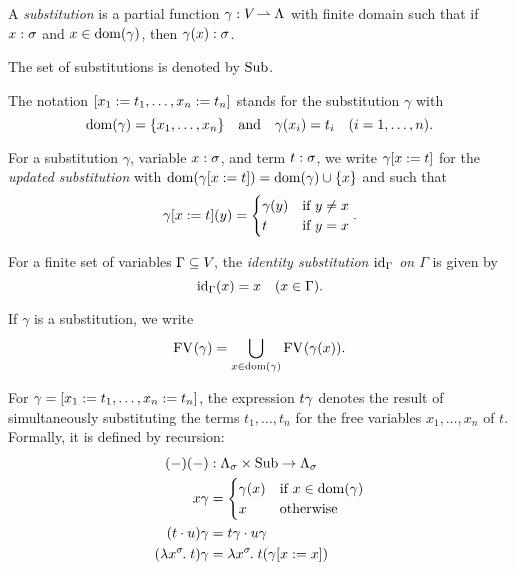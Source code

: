 \begin{defn}[Substitution] \label{def:substitution}
A \emph{substitution} is a partial function $\gamma : \Var \pto \Tm$ with finite domain such that if $\typedvar{x}{\sigma}$ and $x \in \dom{\gamma}$, then $\typedtm{\gamma(x)}{\sigma}$.
\end{defn}

The set of substitutions is denoted by $\Sub$.

\begin{notn} \label{not:substitutions}
\hfill \vspace{-3pt}
\begin{items}
\item The notation $\substnf{x}{t}{n}$ stands for the substitution $\gamma$ with
\[ \dom{\gamma} = \{x_1, \ldots, x_n\} \quad\text{and}\quad
    \gamma(x_i) = t_i \quad (i = 1, \ldots, n). \]

\item For a substitution $\gamma$, variable $\typedvar{x}{\sigma}$, and term $\typedtm{t}{\sigma}$, we write $\updsub{\gamma}{x}{t}$ for the \emph{updated substitution} with $\dom{\updsub{\gamma}{x}{t}} = \dom{\gamma} \cup \singset[x]$ and such that
\[
\updsub{\gamma}{x}{t}(y) = \begin{cases}
                              \gamma(y) & \text{if } y \ne x \\
                              t & \text{if } y = x  
                            \end{cases}.
\]

\item For a finite set of variables $\Gamma \subs \Var$, the \emph{identity substitution $\idsub[\Gamma]$ on $\Gamma$} is given by
\[ \idsub[\Gamma](x) = x \quad (x \in \Gamma). \]

\item If $\gamma$ is a substitution, we write
\[ \FV{\gamma} = \bigcup_{x \in \dom{\gamma}}{\FV{\gamma(x)}}. \]
\end{items}
\end{notn}

\begin{defn} \label{def:subst-in-term}
For $\gamma = \substnf{x}{t}{n}$, the expression $\subst{t}{\gamma}$ denotes the result of simultaneously substituting the terms $t_1, \ldots, t_n$ for the free variables $x_1, \ldots, x_n$ of $t$. Formally, it is defined by recursion:
\begin{align*}
\subst{(-)}{(-)} &: \cartprod{\Tm[\sigma]}{\Sub} \to \Tm[\sigma] \\
\subst{x}{\gamma} &= \begin{cases}
                       \gamma(x) & \text{if $x \in \dom{\gamma}$} \\
                       x         & \text{otherwise}
                     \end{cases} \\
\subst{(\app{t}{u})}{\gamma} &= \app{\subst{t}{\gamma}}{\subst{u}{\gamma}} \\
\subst{(\lamv{x}{\sigma}{t})}{\gamma} &= \lamv{x}{\sigma}{\subst{t}{(\updsub{\gamma}{x}{x})}}
\end{align*}
\end{defn}

